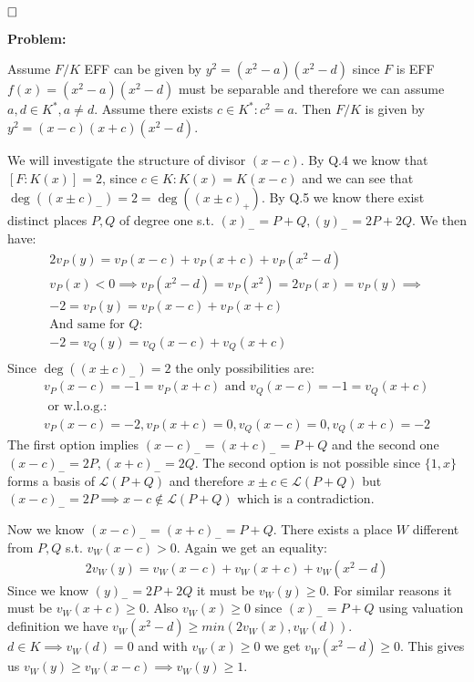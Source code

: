 \documentclass[12pt, a4paper]{article}
\newcommand{\qed}{\hfill\square}
\begin{document}
$\qed$

\textbf{Problem:}

Assume $F/K$ EFF can be given by $y^2=(x^2-a)(x^2-d)$ since $F$ is EFF $f(x)=(x^2-a)(x^2-d)$ must be separable and therefore we can assume $a,d \in K^*, a \neq d$. Assume there exists $c \in K^*: c^2=a$. Then $F/K$ is given by $y^2=(x-c)(x+c)(x^2-d)$.

We will investigate the structure of divisor $(x-c)$. By Q.4 we know that $[F:K(x)]=2$, since $c \in K: K(x)=K(x-c)$ and we can see that $\deg((x\pm c)_{-})=2=\deg((x\pm c)_{+})$. By Q.5 we know there exist distinct places $P,Q$ of degree one s.t. $(x)_{-}=P+Q, (y)_{-}=2P+2Q$. We then have:
\begin{gather*}
2v_P(y)=v_P(x-c)+v_P(x+c)+v_P(x^2-d)\\
v_P(x) < 0 \implies v_P(x^2-d)=v_P(x^2)=2v_P(x)=v_P(y) \implies\\
-2 = v_P(y) = v_P(x-c)+v_P(x+c)\\
\text{And same for $Q$:}\\
-2 = v_Q(y) = v_Q(x-c)+v_Q(x+c)\\
\end{gather*}
Since $\deg((x\pm c)_{-})=2$ the only possibilities are:
\begin{gather*}
v_P(x-c) = -1 = v_P(x+c) \text{ and } v_Q(x-c) = -1 = v_Q(x+c) \\
\text{ or w.l.o.g.:}\\
v_P(x-c) = -2, v_P(x+c) = 0, v_Q(x-c)=0, v_Q(x+c) = -2
\end{gather*}
The first option implies $(x-c)_{-}=(x+c)_{-}=P+Q$ and the second one $(x-c)_{-}=2P, (x+c)_{-}=2Q$. The second option is not possible since $\{1,x\}$ forms a basis of $\mathcal{L}(P+Q)$ and therefore $x \pm c \in \mathcal{L}(P+Q)$ but $(x-c)_{-}=2P \implies x-c \notin \mathcal{L}(P+Q)$ which is a contradiction.

Now we know $(x-c)_{-}=(x+c)_{-}=P+Q$. There exists a place $W$ different from $P,Q$ s.t. $v_W(x-c) > 0$. Again we get an equality:
\begin{gather*}
2v_W(y) = v_W(x-c)+v_W(x+c)+v_W(x^2-d)
\end{gather*}
Since we know $(y)_{-}=2P+2Q$ it must be $v_W(y) \geq 0$. For similar reasons it must be $v_W(x+c) \geq 0$. Also $v_W(x) \geq 0$ since $(x)_{-} = P+Q$ using valuation definition we have $v_W(x^2-d) \geq min(2v_W(x), v_W(d))$. $d \in K \implies v_W(d)=0$ and with $v_W(x) \geq 0$ we get $v_W(x^2-d) \geq 0$. This gives us $v_W(y) \geq v_W(x-c) \implies v_W(y) \geq 1$. 
\end{document}
